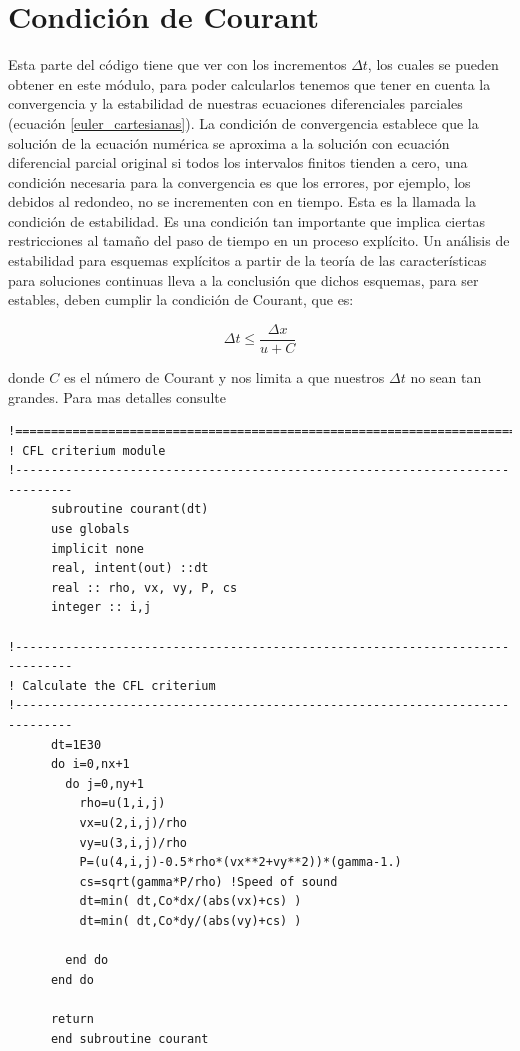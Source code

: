 \documentclass[12pt,a4paper]{book}
\begin{document}
\section{Condición de Courant}\label{Ap:Condicion_Courant}
Esta parte del código tiene que ver con los incrementos $\Delta t$, los cuales se pueden obtener en este módulo, para poder calcularlos tenemos que tener en cuenta la convergencia 
y la estabilidad de nuestras ecuaciones diferenciales parciales (ecuación \ref{euler_cartesianas}). La condición de convergencia establece que la solución de la ecuación numérica se aproxima a la solución con ecuación 
diferencial 
parcial original si todos los intervalos finitos tienden a cero, una condición necesaria para la convergencia es que los errores, por ejemplo, los debidos al redondeo, no se incrementen con en tiempo. 
Esta es la llamada la condición de estabilidad. Es una condición tan importante que implica ciertas restricciones al tamaño del paso de tiempo en un proceso explícito. Un análisis de estabilidad para esquemas 
explícitos a partir de la teoría de las características para soluciones continuas lleva a la conclusión que dichos esquemas, para ser estables, deben cumplir la condición de Courant, que es: 

\begin{equation}
\Delta t \leq \frac{\Delta x}{u+C}
\end{equation}

\noindent donde $C$ es el número de Courant y nos limita a que nuestros $\Delta t$ no sean tan grandes. Para mas detalles
consulte \cite{Toro1997}
\begin{lstlisting}[frame=single]
!==============================================================================
! CFL criterium module
!------------------------------------------------------------------------------
      subroutine courant(dt)
      use globals
      implicit none
      real, intent(out) ::dt
      real :: rho, vx, vy, P, cs
      integer :: i,j

!------------------------------------------------------------------------------
! Calculate the CFL criterium
!------------------------------------------------------------------------------
      dt=1E30
      do i=0,nx+1
        do j=0,ny+1
          rho=u(1,i,j)
          vx=u(2,i,j)/rho
          vy=u(3,i,j)/rho
          P=(u(4,i,j)-0.5*rho*(vx**2+vy**2))*(gamma-1.)
          cs=sqrt(gamma*P/rho) !Speed of sound
          dt=min( dt,Co*dx/(abs(vx)+cs) )
          dt=min( dt,Co*dy/(abs(vy)+cs) )

        end do
      end do

      return
      end subroutine courant

\end{lstlisting}
\end{document}
